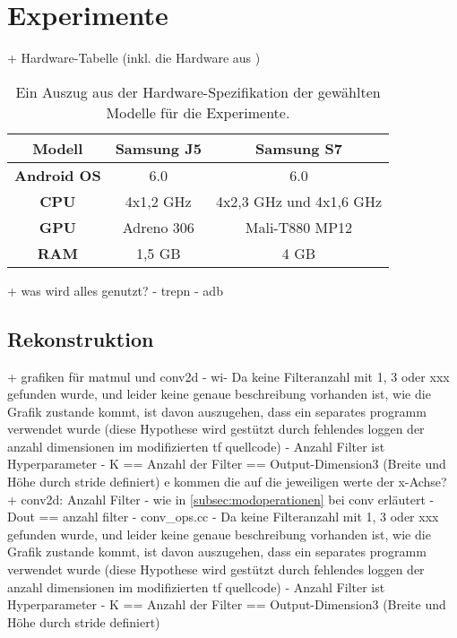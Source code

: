 \section{Experimente}
\label{sec:experimente}
+ Hardware-Tabelle (inkl. die Hardware aus \cite{rstensorflow2017})

\renewcommand{\arraystretch}{1.5}
\begin{table}[!ht]
	\begin{center}
		\begin{tabular}{c||c|c}
			\textbf{Modell} & Samsung J5 & Samsung S7 \\
			\hline
			\textbf{Android OS} & 6.0 & 6.0 \\
			\hline
			\textbf{CPU} & 4x1,2 GHz & 4x2,3 GHz und 4x1,6 GHz \\
			\hline
			\textbf{GPU} & Adreno 306 & Mali-T880 MP12 \\ 
			\hline
			\textbf{RAM} & 1,5 GB & 4 GB \\
		\end{tabular}
	\end{center}
	\caption{Ein Auszug aus der Hardware-Spezifikation der gewählten Modelle für die Experimente. }
	\label{tbl:hardware}
\end{table}
+ was wird alles genutzt? 
	- trepn
	- adb

\subsection{Rekonstruktion}
\label{subsec:rekonstruktion}
+ grafiken für matmul und conv2d - wi- Da keine Filteranzahl mit 1, 3 oder xxx gefunden wurde, und leider keine genaue beschreibung vorhanden ist, wie die Grafik zustande kommt, ist davon auszugehen, dass ein separates programm verwendet wurde (diese Hypothese wird gestützt durch fehlendes loggen der anzahl dimensionen im modifizierten tf quellcode)
- Anzahl Filter ist Hyperparameter
- K == Anzahl der Filter == Output-Dimension3 (Breite und Höhe durch stride definiert)
e kommen die auf die jeweiligen werte der x-Achse?
+ conv2d: Anzahl Filter
- wie in \ref{subsec:modoperationen} bei conv erläutert - Dout == anzahl filter
- conv\_ops.cc
- Da keine Filteranzahl mit 1, 3 oder xxx gefunden wurde, und leider keine genaue beschreibung vorhanden ist, wie die Grafik zustande kommt, ist davon auszugehen, dass ein separates programm verwendet wurde (diese Hypothese wird gestützt durch fehlendes loggen der anzahl dimensionen im modifizierten tf quellcode)
- Anzahl Filter ist Hyperparameter
- K == Anzahl der Filter == Output-Dimension3 (Breite und Höhe durch stride definiert)


